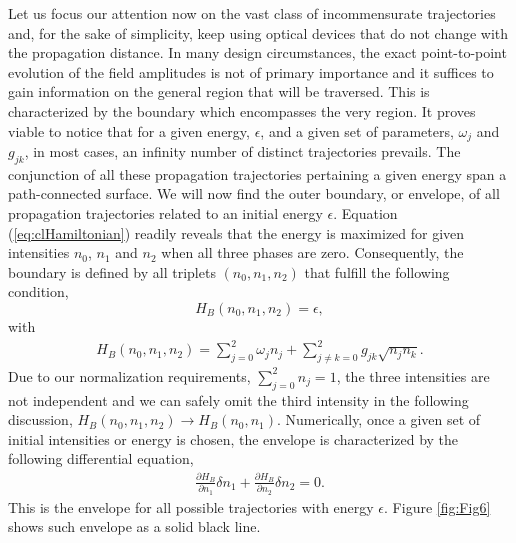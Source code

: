 \documentclass[9pt,twocolumn,twoside]{osajnl}
\begin{document}
Let us focus our attention now on the vast class of incommensurate trajectories and, for the sake of simplicity, keep using optical devices that do not change with the propagation distance.
In many design circumstances, the exact point-to-point evolution of the field amplitudes is not of primary importance and it suffices to gain information on the general region that will be traversed. 
This is characterized by the boundary which encompasses the very region. 
It proves viable to notice that for a given energy, $\epsilon$, and a given set of parameters, $\omega_{j}$ and $g_{jk}$, in most cases, an infinity number of distinct trajectories prevails.
The conjunction of all these propagation trajectories pertaining a given energy span a path-connected surface.
We will now find the outer boundary, or envelope, of all propagation trajectories related to an initial energy $\epsilon$.
Equation (\ref{eq:clHamiltonian}) readily reveals that the energy is maximized for given intensities $n_0$, $n_1$ and $n_2$ when all three phases are zero. 
Consequently, the boundary is defined by all triplets $\left( n_0,n_1,n_2 \right)$ that fulfill the following condition,
\begin{equation}
	H_{B}(n_0,n_1,n_2) = \epsilon,	
\end{equation}
with 
\begin{eqnarray}
H_{B}(n_0,n_1,n_2) = \sum_{j=0}^{2} \omega_{j} n_{j}  
	+ \sum_{j \neq k = 0}^{2} g_{jk} \sqrt{n_{j} n_{k}}.
\end{eqnarray}
Due to our normalization requirements, $\sum_{j=0}^{2} n_{j} = 1$, the three intensities are not independent and we can safely omit the third intensity in the following discussion,  
$H_{B}(n_0,n_1,n_2) \rightarrow H_{B}(n_0,n_1)$.
Numerically, once a given set of initial intensities or energy is chosen, the envelope is characterized by the following differential equation,
\begin{eqnarray}
	\frac{\partial H_{B}}{\partial n_1}\delta n_1 + 
	\frac{\partial H_{B}}{\partial n_2}\delta n_2 = 0.
\end{eqnarray}
This is the envelope for all possible trajectories with energy $\epsilon$.
Figure \ref{fig:Fig6} shows such envelope as a solid black line.
\end{document}
